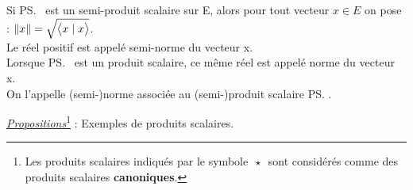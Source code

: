 \vspace{0.5cm}

\noindent Si \ps\, est un semi-produit scalaire sur E, alors pour tout vecteur \(x\in E\) on pose : \(\left\lVert x\right\rVert=\sqrt{\bigl\langle x\mid x \bigr\rangle} \).\\
Le réel positif  est appelé semi-norme du vecteur x.\\
Lorsque \ps \ est un produit scalaire, ce même réel est appelé norme du vecteur x.\\
On l'appelle (semi-)norme associée au (semi-)produit scalaire \ps.

\vspace{1cm}

\noindent \underline{\emph{Propositions}}\footnote{Les produits scalaires indiqués par le symbole \(\,\star\,\) sont considérés comme des produits scalaires \textbf{canoniques}.} : Exemples de produits scalaires.\vspace{-0.4cm}
